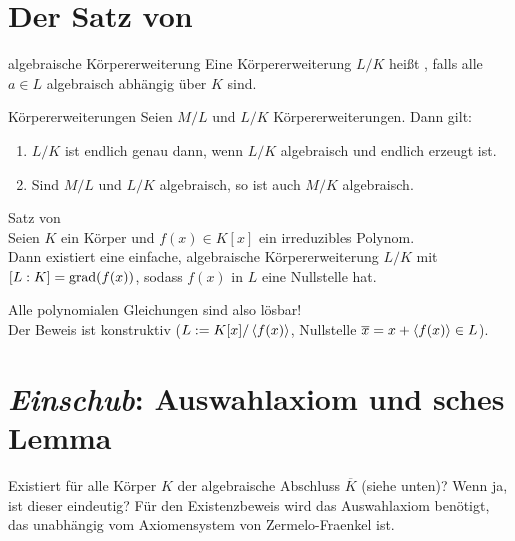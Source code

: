 \pagebreak

\section{%
    Der Satz von %
}

\begin{Def}{algebraische Körpererweiterung}
    Eine Körpererweiterung $L/K$ heißt , falls alle
    $a \in L$ algebraisch abhängig über $K$ sind.
\end{Def}

\begin{Prop}{Körpererweiterungen}
    Seien $M/L$ und $L/K$ Körpererweiterungen. Dann gilt:
    \begin{enumerate}[label=(\alph*)]
        \item
        $L/K$ ist endlich genau dann, wenn $L/K$ algebraisch
        und endlich erzeugt ist.

        \item
        Sind $M/L$ und $L/K$ algebraisch, so ist auch $M/K$ algebraisch.
    \end{enumerate}
\end{Prop}

\begin{Theorem}{Satz von \upshape\,\!}\\
    Seien $K$ ein Körper und $f(x) \in K[x]$ ein irreduzibles Polynom.\\
    Dann existiert eine einfache, algebraische Körpererweiterung $L/K$ mit
    $[L:K] = \operatorname{grad}(f(x))$, sodass $f(x)$ in $L$ eine Nullstelle hat.
\end{Theorem}

\begin{Bem}
    Alle polynomialen Gleichungen sind also lösbar!\\
    Der Beweis ist konstruktiv ($L := K[x]/\left\langle f(x)\right\rangle$,
    Nullstelle $\overline{x} = x + \left\langle f(x)\right\rangle \in L$).
\end{Bem}

\section{%
    \emph{Einschub}: Auswahlaxiom und sches Lemma%
}

\begin{Bem}
    Existiert für alle Körper $K$ der algebraische Abschluss $\overline{K}$
    (siehe unten)?
    Wenn ja, ist dieser eindeutig?
    Für den Existenzbeweis wird das Auswahlaxiom benötigt, das unabhängig
    vom Axiomensystem von Zermelo-Fraenkel ist.
\end{Bem}

